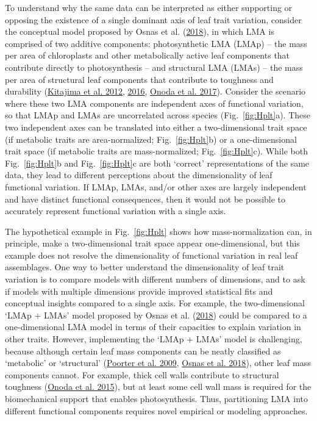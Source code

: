 \documentclass[
  12pt,
  a4paper,
,tablecaptionabove
]{scrartcl}
\begin{document}
To understand why the same data can be interpreted as either supporting or opposing the existence of a single dominant axis of leaf trait variation, consider the conceptual model proposed by Osnas et al. (\protect\hyperlink{ref-Osnas2018}{2018}), in which LMA is comprised of two additive components:
photosynthetic LMA (LMAp) -- the mass per area of chloroplasts and other metabolically active leaf components that contribute directly to photosynthesis -- and structural LMA (LMAs) -- the mass per area of structural leaf components that contribute to toughness and durability (\protect\hyperlink{ref-Kitajima2012}{Kitajima et al. 2012}, \protect\hyperlink{ref-Kitajima2016}{2016}, \protect\hyperlink{ref-Onoda2017}{Onoda et al. 2017}).
Consider the scenario where these two LMA components are independent axes of functional variation, so that LMAp and LMAs are uncorrelated across species (Fig.~\ref{fig:Hplt}a).
These two independent axes can be translated into either a two-dimensional trait space (if metabolic traits are area-normalized; Fig.~\ref{fig:Hplt}b) or a one-dimensional trait space (if metabolic traits are mass-normalized; Fig.~\ref{fig:Hplt}c).
While both Fig.~\ref{fig:Hplt}b and Fig.~\ref{fig:Hplt}c are both `correct' representations of the same data, they lead to different perceptions about the dimensionality of leaf functional variation.
If LMAp, LMAs, and/or other axes are largely independent and have distinct functional consequences, then it would not be possible to accurately represent functional variation with a single axis.

The hypothetical example in Fig.~\ref{fig:Hplt} shows how mass-normalization can, in principle, make a two-dimensional trait space appear one-dimensional, but this example does not resolve the dimensionality of functional variation in real leaf assemblages.
One way to better understand the dimensionality of leaf trait variation is to compare models with different numbers of dimensions, and to ask if models with multiple dimensions provide improved statistical fits and conceptual insights compared to a single axis.
For example, the two-dimensional `LMAp + LMAs' model proposed by Osnas et al. (\protect\hyperlink{ref-Osnas2018}{2018}) could be compared to a one-dimensional LMA model in terms of their capacities to explain variation in other traits.
However, implementing the `LMAp + LMAs' model is challenging, because although certain leaf mass components can be neatly classified as `metabolic' or `structural' (\protect\hyperlink{ref-Poorter2009}{Poorter et al. 2009}, \protect\hyperlink{ref-Osnas2018}{Osnas et al. 2018}), other leaf mass components cannot.
For example, thick cell walls contribute to structural toughness (\protect\hyperlink{ref-Onoda2015}{Onoda et al. 2015}), but at least some cell wall mass is required for the biomechanical support that enables photosynthesis.
Thus, partitioning LMA into different functional components requires novel empirical or modeling approaches.
\end{document}
